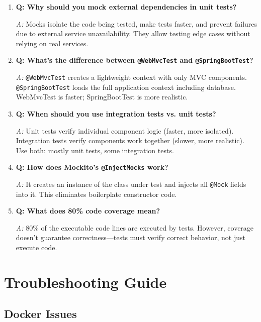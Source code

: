\documentclass[12pt,a4paper]{article}
\begin{document}
\begin{enumerate}
    \item \textbf{Q: Why should you mock external dependencies in unit tests?}

    \textit{A:} Mocks isolate the code being tested, make tests faster, and prevent failures due to external service unavailability. They allow testing edge cases without relying on real services.

    \item \textbf{Q: What's the difference between \texttt{@WebMvcTest} and \texttt{@SpringBootTest}?}

    \textit{A:} \texttt{@WebMvcTest} creates a lightweight context with only MVC components. \texttt{@SpringBootTest} loads the full application context including database. WebMvcTest is faster; SpringBootTest is more realistic.

    \item \textbf{Q: When should you use integration tests vs. unit tests?}

    \textit{A:} Unit tests verify individual component logic (faster, more isolated). Integration tests verify components work together (slower, more realistic). Use both: mostly unit tests, some integration tests.

    \item \textbf{Q: How does Mockito's \texttt{@InjectMocks} work?}

    \textit{A:} It creates an instance of the class under test and injects all \texttt{@Mock} fields into it. This eliminates boilerplate constructor code.

    \item \textbf{Q: What does 80\% code coverage mean?}

    \textit{A:} 80\% of the executable code lines are executed by tests. However, coverage doesn't guarantee correctness—tests must verify correct behavior, not just execute code.
\end{enumerate}

\newpage

\appendix

\section{Troubleshooting Guide}

\subsection{Docker Issues}
\end{document}
